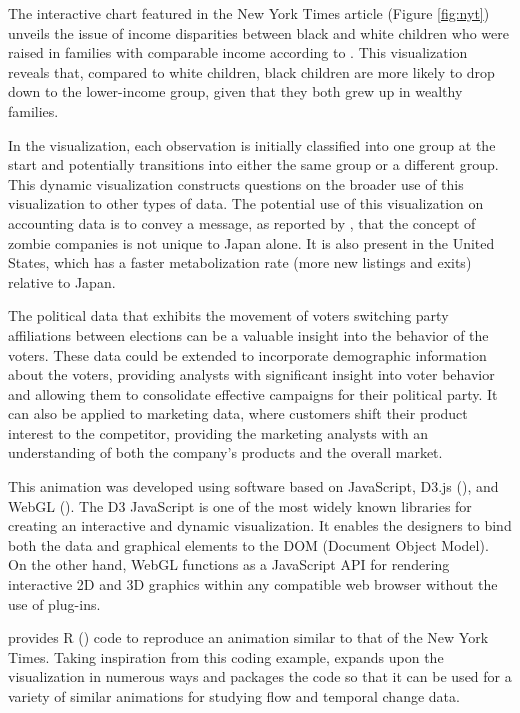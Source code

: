 The interactive chart featured in the New York Times article (Figure \ref{fig:nyt}) unveils the issue of income disparities between black and white children who were raised in families with comparable income according to \citet{race}. This visualization reveals that, compared to white children, black children are more likely to drop down to the lower-income group, given that they both grew up in wealthy families.

In the visualization, each observation is initially classified into one group at the start and potentially transitions into either the same group or a different group. This dynamic visualization constructs questions on the broader use of this visualization to other types of data. The potential use of this visualization on accounting data is to convey a message, as reported by \citet{oecd_report}, that the concept of zombie companies is not unique to Japan alone. It is also present in the United States, which has a faster metabolization rate (more new listings and exits) relative to Japan.

The political data that exhibits the movement of voters switching party affiliations between elections can be a valuable insight into the behavior of the voters. These data could be extended to incorporate demographic information about the voters, providing analysts with significant insight into voter behavior and allowing them to consolidate effective campaigns for their political party. It can also be applied to marketing data, where customers shift their product interest to the competitor, providing the marketing analysts with an understanding of both the company's products and the overall market.

This animation was developed using software based on JavaScript, D3.js (\citet{d3js}), and WebGL (\citet{webgl}). The D3 JavaScript is one of the most widely known libraries for creating an interactive and dynamic visualization. It enables the designers to bind both the data and graphical elements to the DOM (Document Object Model). On the other hand, WebGL functions as a JavaScript API for rendering interactive 2D and 3D graphics within any compatible web browser without the use of plug-ins.

\citet{Hvitfeldt_2018} provides R (\citet{r}) code to reproduce an animation similar to that of the New York Times. Taking inspiration from this coding example,  expands upon the visualization in numerous ways and packages the code so that it can be used for a variety of similar animations for studying flow and temporal change data.

